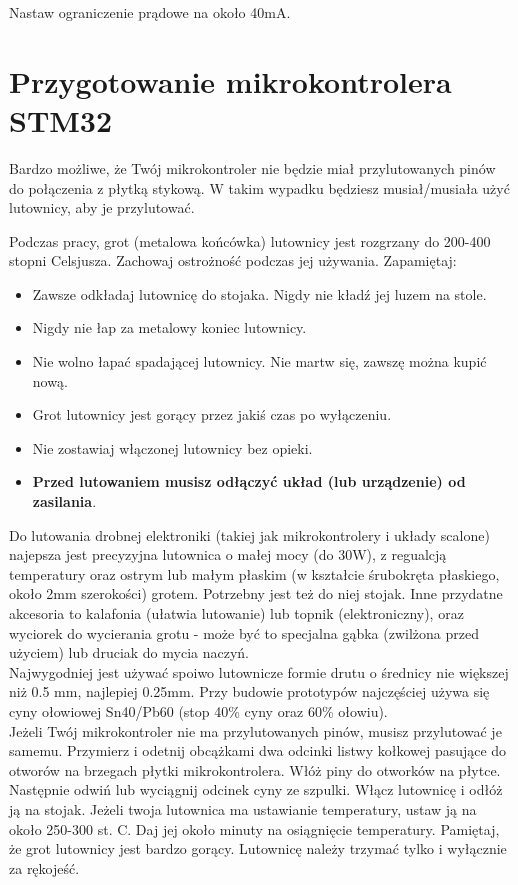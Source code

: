 \documentclass{pdfBooklets}
\begin{document}
Nastaw ograniczenie prądowe na około 40mA.


\section{Przygotowanie mikrokontrolera STM32}

Bardzo możliwe, że Twój mikrokontroler nie będzie miał przylutowanych pinów do połączenia z płytką stykową.
W takim wypadku będziesz musiał/musiała użyć lutownicy, aby je przylutować.\\

\begin{ProTip}{}
  Podczas pracy, grot (metalowa końcówka) lutownicy jest rozgrzany do 200-400 stopni Celsjusza. Zachowaj ostrożność
  podczas jej używania. Zapamiętaj:
  \begin{itemize}
  \item Zawsze odkładaj lutownicę do stojaka. Nigdy nie kładź jej luzem na stole.
  \item Nigdy nie łap za metalowy koniec lutownicy.
  \item Nie wolno łapać spadającej lutownicy. Nie martw się, zawszę można kupić nową.
  \item Grot lutownicy jest gorący przez jakiś czas po wyłączeniu.
  \item Nie zostawiaj włączonej lutownicy bez opieki.
  \item \textbf{Przed lutowaniem musisz odłączyć układ (lub urządzenie) od zasilania}.
  \end{itemize}
\end{ProTip}

Do lutowania drobnej elektroniki (takiej jak mikrokontrolery i układy scalone) najepsza jest precyzyjna lutownica o małej mocy (do 30W),
z regualcją temperatury oraz ostrym lub małym płaskim (w kształcie śrubokręta płaskiego, około 2mm szerokości) grotem. Potrzebny jest też do niej
stojak. Inne przydatne akcesoria to kalafonia (ułatwia lutowanie) lub topnik (elektroniczny), oraz wyciorek do wycierania grotu - może być to specjalna gąbka (zwilżona
przed użyciem) lub druciak do mycia naczyń.\\

Najwygodniej jest używać spoiwo lutownicze formie drutu o średnicy nie większej niż 0.5 mm, najlepiej 0.25mm. Przy budowie prototypów
najczęściej używa się cyny ołowiowej Sn40/Pb60 (stop 40\% cyny oraz 60\% ołowiu).
\\

Jeżeli Twój mikrokontroler nie ma przylutowanych pinów, musisz przylutować je samemu. Przymierz i odetnij
obcążkami dwa odcinki listwy kołkowej pasujące do otworów na brzegach płytki mikrokontrolera. Włóż piny do otworków
na płytce. Następnie odwiń lub wyciągnij odcinek cyny ze szpulki. Włącz lutownicę i odłóż ją na stojak. Jeżeli twoja lutownica
ma ustawianie temperatury, ustaw ją na około 250-300 st. C. Daj jej około minuty na osiągnięcie temperatury. Pamiętaj, że grot
lutownicy jest bardzo gorący. Lutownicę należy trzymać tylko i wyłącznie za rękojeść.
\\
\end{document}
